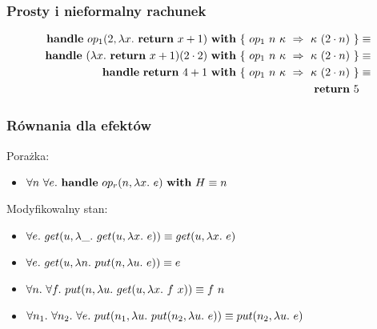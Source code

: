 \documentclass[polish, 13pt, usenames, dvipsnames]{beamer}
\begin{document}
\begin{frame}
  \frametitle{Prosty i nieformalny rachunek}
  \begin{example}
    \vspace{-1em}
  \begin{equation*}\begin{split}%
      \handle{\opi{1}{2}{\fun{x}{\return{x + 1}}}}{\{\ \hcase{op_1}{n\ \kappa}{\kappa\ (2 \cdot n)} \ \}} &\equiv \\
      \handle{(\fun{x}{\return{x+1}}) (2 \cdot 2)}{\{\ \hcase{op_1}{n\ \kappa}{\kappa\ (2 \cdot n)} \ \}} &\equiv \\
      \handle{\return{4+1}}{\{\ \hcase{op_1}{n\ \kappa}{\kappa\ (2 \cdot n)} \ \}} &\equiv \\
      \return{5} %
  \end{split}\end{equation*}
  \end{example}
\end{frame}

\begin{frame}
  \frametitle{Równania dla efektów}

  Porażka:
  \begin{itemize}
    \item \(\forall n\ \forall e.\ \mathbf{handle}\ op_r(n, \lambda x.\ e)\ \mathbf{with}\ H \equiv n\)
  \end{itemize}

  \vspace{1em}

  Modyfikowalny stan:
  \begin{itemize}
  \item \(\forall e.\ get(u, \lambda \_.\ get(u, \lambda x.\ e)) \equiv get(u, \lambda x.\ e)\)
  \item \(\forall e.\ get(u, \lambda n.\ put(n, \lambda u.\ e)) \equiv e\)
  \item \(\forall n.\ \forall f.\ put(n, \lambda u.\ get(u, \lambda x.\ f\ x)) \equiv f\ n\)
  \item \(\forall n_1.\ \forall n_2.\ \forall e.\ put(n_1, \lambda u.\ put(n_2, \lambda u.\ e)) \equiv put(n_2, \lambda u.\ e)\)
  \end{itemize}
\end{frame}
\end{document}
